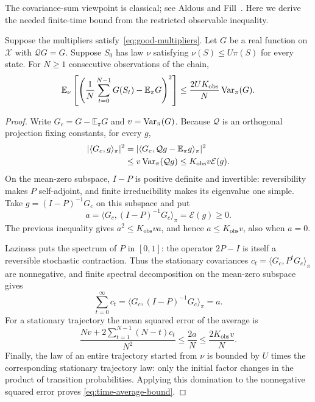 The covariance-sum viewpoint is classical; see
Aldous and Fill~\cite[Section~2.3]{AF2002}. Here we derive the needed
finite-time bound from the restricted observable inequality.

\begin{lemma}
\label{lem:time-average}
Suppose the multipliers satisfy~\eqref{eq:good-multipliers}.
Let $G$ be a real function on $\mathcal X$ with $\mathcal QG=G$.
Suppose $S_0$ has law $\nu$ satisfying $\nu(S)\leq U\pi(S)$ for
every state. For $N\geq1$ consecutive observations of the chain,
\begin{equation}
 \mathbb E_\nu\left[
    \left(\frac1N\sum_{t=0}^{N-1}G(S_t)-\mathbb E_\pi G\right)^2
                  \right]
 \leq\frac{2UK_{\mathrm{obs}}}{N}\operatorname{Var}_\pi(G).
 \label{eq:time-average-bound}
\end{equation}
\end{lemma}

\begin{proof}
Write $G_c=G-\mathbb E_\pi G$ and $v=\operatorname{Var}_\pi(G)$.
Because $\mathcal Q$ is an orthogonal projection fixing constants,
for every $g$,
\begin{align*}
 |\langle G_c,g\rangle_\pi|^2
 &=|\langle G_c,\mathcal Qg-\mathbb E_\pi g\rangle_\pi|^2\\
 &\leq v\operatorname{Var}_\pi(\mathcal Qg)
 \leq K_{\mathrm{obs}}v\mathcal E(g).
\end{align*}
On the mean-zero subspace, $I-P$ is positive definite and invertible:
reversibility makes $P$ self-adjoint, and finite irreducibility makes
its eigenvalue one simple. Take
$g=(I-P)^{-1}G_c$ on this subspace and put
\[
 a=\langle G_c,(I-P)^{-1}G_c\rangle_\pi=\mathcal E(g)\geq0.
\]
The previous inequality gives $a^2\leq K_{\mathrm{obs}}va$, and hence
$a\leq K_{\mathrm{obs}}v$, also when $a=0$.

Laziness puts the spectrum of $P$ in $[0,1]$: the operator $2P-I$ is
itself a reversible stochastic contraction. Thus the stationary
covariances
$c_t=\langle G_c,P^tG_c\rangle_\pi$ are nonnegative, and finite
spectral decomposition on the mean-zero subspace gives
\[
  \sum_{t=0}^{\infty}c_t
  =\langle G_c,(I-P)^{-1}G_c\rangle_\pi=a.
\]
For a stationary trajectory the mean squared error of the average is
\[
 \frac{Nv+2\sum_{t=1}^{N-1}(N-t)c_t}{N^2}
 \leq\frac{2a}{N}
 \leq\frac{2K_{\mathrm{obs}}v}{N}.
\]
Finally, the law of an entire trajectory started from $\nu$ is
bounded by $U$ times the corresponding stationary trajectory law:
only the initial factor changes in the product of transition
probabilities. Applying this domination to the nonnegative squared
error proves \eqref{eq:time-average-bound}.
\end{proof}

